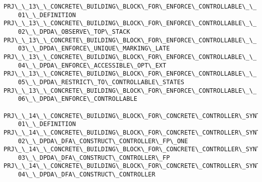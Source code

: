 \begin{verbatim}
PRJ\_\_13\_\_CONCRETE\_BUILDING\_BLOCK\_FOR\_ENFORCE\_CONTROLLABLE\_\_
    01\_\_DEFINITION
PRJ\_\_13\_\_CONCRETE\_BUILDING\_BLOCK\_FOR\_ENFORCE\_CONTROLLABLE\_\_
    02\_\_DPDA\_OBSERVE\_TOP\_STACK
PRJ\_\_13\_\_CONCRETE\_BUILDING\_BLOCK\_FOR\_ENFORCE\_CONTROLLABLE\_\_
    03\_\_DPDA\_ENFORCE\_UNIQUE\_MARKING\_LATE
PRJ\_\_13\_\_CONCRETE\_BUILDING\_BLOCK\_FOR\_ENFORCE\_CONTROLLABLE\_\_
    04\_\_DPDA\_ENFORCE\_ACCESSIBLE\_OPT\_EXT
PRJ\_\_13\_\_CONCRETE\_BUILDING\_BLOCK\_FOR\_ENFORCE\_CONTROLLABLE\_\_
    05\_\_DPDA\_RESTRICT\_TO\_CONTROLLABLE\_STATES
PRJ\_\_13\_\_CONCRETE\_BUILDING\_BLOCK\_FOR\_ENFORCE\_CONTROLLABLE\_\_
    06\_\_DPDA\_ENFORCE\_CONTROLLABLE

PRJ\_\_14\_\_CONCRETE\_BUILDING\_BLOCK\_FOR\_CONCRETE\_CONTROLLER\_SYNTHESIS\_ALGORITHM\_\_
    01\_\_DEFINITION
PRJ\_\_14\_\_CONCRETE\_BUILDING\_BLOCK\_FOR\_CONCRETE\_CONTROLLER\_SYNTHESIS\_ALGORITHM\_\_
    02\_\_DPDA\_DFA\_CONSTRUCT\_CONTROLLER\_FP\_ONE
PRJ\_\_14\_\_CONCRETE\_BUILDING\_BLOCK\_FOR\_CONCRETE\_CONTROLLER\_SYNTHESIS\_ALGORITHM\_\_
    03\_\_DPDA\_DFA\_CONSTRUCT\_CONTROLLER\_FP
PRJ\_\_14\_\_CONCRETE\_BUILDING\_BLOCK\_FOR\_CONCRETE\_CONTROLLER\_SYNTHESIS\_ALGORITHM\_\_
    04\_\_DPDA\_DFA\_CONSTRUCT\_CONTROLLER
\end{verbatim}
\endgroup

